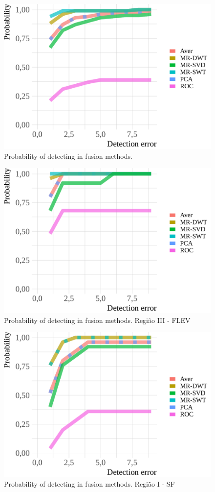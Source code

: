 \documentclass[journal]{IEEEtran}
\begin{document}
\begin{figure}[hbt]
\centering
	\includegraphics[width=.8\linewidth]{metricas_6_fusao_flevoland}
	\caption{Probability of detecting in fusion methods.}
\label{probability_edge_detc}
\end{figure}


\begin{figure}[hbt]
\centering
	\includegraphics[width=.8\linewidth]{metricas_6_fusao_flevoland_r3}
	\caption{Probability of detecting in fusion methods. Região III - FLEV} 
\label{probability_edge_detc}
\end{figure}


\begin{figure}[hbt]
\centering
	\includegraphics[width=.8\linewidth]{metricas_6_fusao_sf_r3}
	\caption{Probability of detecting in fusion methods. Região I - SF} 
\label{probability_edge_detc}
\end{figure}
\end{document}
